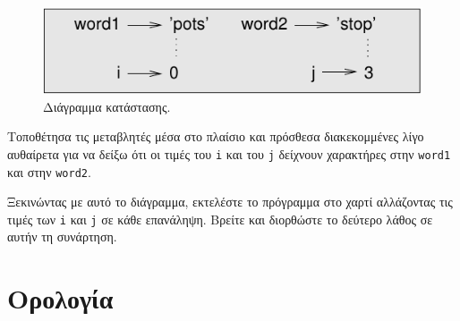 \documentclass[10pt]{book}
\begin{document}
\begin{figure}
\centerline
{\includegraphics[scale=0.8]{figs/state4.pdf}}
\caption{Διάγραμμα κατάστασης.}
\label{fig.state4}
\end{figure}

Τοποθέτησα τις μεταβλητές μέσα στο πλαίσιο και πρόσθεσα διακεκομμένες λίγο αυθαίρετα για να δείξω ότι οι τιμές του {\tt i} και του {\tt j} δείχνουν χαρακτήρες στην {\tt word1} και στην {\tt word2}.
\\
\begin{exercise}
\label{isreverse}

Ξεκινώντας με αυτό το διάγραμμα, εκτελέστε το πρόγραμμα στο χαρτί αλλάζοντας
τις τιμές των {\tt i} και {\tt j} σε κάθε επανάληψη. Βρείτε και διορθώστε το δεύτερο λάθος σε αυτήν τη συνάρτηση.
\end{exercise}



\section{Ορολογία}
\end{document}
